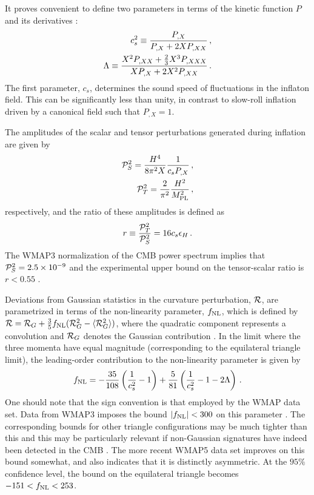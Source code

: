  
It proves convenient to define two parameters in terms of the 
kinetic  function $P$ and its derivatives \cite{lidser1,lidser3}: 
% 
\begin{eqnarray}
\label{eq:defcs-dbiintro}
 c_s^2 \equiv \frac{P_{,X}}{P_{,X} + 2X P_{,XX}} \,,
\\
\label{eq:deflambda-dbiintro}
\Lambda \equiv  \frac{X^2 P_{,XX} +
\frac{2}{3}X^3 P_{,XXX}}{X P_{,X} +
2X^2 P_{,XX}}\,.
\end{eqnarray}
% 
The first parameter, $c_s$, determines the sound speed of fluctuations 
in the inflaton field. This can be significantly less than unity, 
in contrast to slow-roll inflation driven by a canonical 
field such that $P_{,X} =1$.


The amplitudes of the scalar and tensor perturbations 
generated during inflation are given by \cite{gm}
% 
\begin{eqnarray} 
\label{eq:Ps-dbiintro}
 \mathcal{P}_S^2 = \frac{H^4}{8\pi^2 X}\frac{1}{c_s P_{,X}} \,,
\\
\label{eq:Pt-dbiintro}
\mathcal{P}_T^2 = \frac{2}{\pi^2} \frac{H^2}{M_{\mathrm{PL}}^2} \,,
\end{eqnarray}
% 
respectively, and the ratio of these amplitudes 
is defined as \cite{gm} 
% 
\begin{equation}
\label{eq:rdefn-dbiintro}
r\equiv \frac{\mathcal{P}_T^2}{\mathcal{P}_S^2} = 16c_s \epsilon_H \,.
\end{equation}
%   
The WMAP3 normalization of the CMB power spectrum 
implies that $\mathcal{P}_S^2= 2.5\times10^{-9}$ and 
the experimental upper bound on the tensor-scalar 
ratio is $r <0.55$ \cite{spergel}.


Deviations from Gaussian statistics in the curvature perturbation, ${\cal{R}}$,
are parametrized in terms of the non-linearity parameter, 
$f_{\mathrm{NL}}$, which is defined by ${\cal{R}} = {\cal{R}}_G + \frac{3}{5} f_{\mathrm{NL}}  (
{\cal{R}}_G^2 -\langle {\cal{R}}_G^2 \rangle )$, where the 
quadratic component represents a convolution and 
${\cal{R}}_G$ denotes the Gaussian contribution \cite{maldacena}. In the limit  
where the three momenta have equal magnitude (corresponding to the equilateral  
triangle limit), the leading-order contribution to the non-linearity 
parameter is given by \cite{chenetal,lidser3}
% 
\begin{equation} 
\label{eq:fnldefn-dbiintro}
 f_{\mathrm{NL}} = -\frac{35}{108}\left(\frac{1}{c_s^2} -1 \right) +
\frac{5}{81}\left( \frac{1}{c_s^2} -1 -2\Lambda \right) \,.
\end{equation}
%  
One should note that the sign convention is that employed
by the WMAP data set.
Data from WMAP3 imposes the bound $|f_{\mathrm{NL}}| < 300$ on this parameter
\cite{spergel}. The corresponding bounds for other triangle configurations 
may be much tighter than this and this may be particularly relevant if 
non-Gaussian signatures have indeed been detected in the 
CMB \cite{Yadav:2007yy,crim}. The more recent WMAP5 data set
\cite{Komatsu:2008hk} improves on this bound somewhat, and
also indicates that it is distinctly asymmetric. At the $95 \%$ confidence level, the bound on the 
equilateral triangle becomes $-151 < f_{\mathrm{NL}} < 253$.


